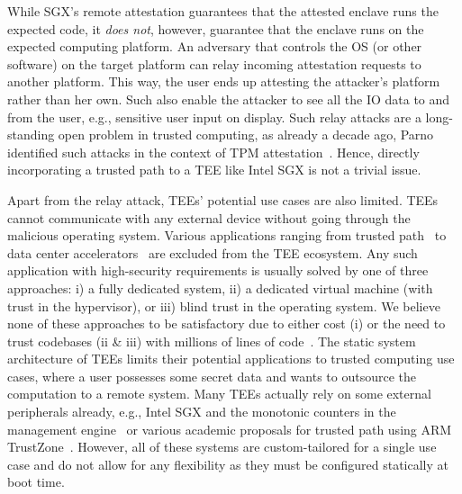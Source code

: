 While SGX's remote attestation guarantees that the attested enclave runs the expected code, it \emph{does not}, however,  guarantee that the enclave runs on the expected computing platform. An adversary that controls the OS (or other software) on the target platform can relay incoming attestation requests to another platform. This way, the user ends up attesting the attacker's platform rather than her own. Such also enable the attacker to see all the IO data to and from the user, e.g., sensitive user input on display. Such relay attacks are a long-standing open problem in trusted computing, as already a decade ago, Parno identified such attacks in the context of TPM attestation~\cite{parno2008bootstrapping}. Hence, directly incorporating a trusted path to a TEE like Intel SGX is not a trivial issue.



Apart from the relay attack, TEEs' potential use cases are also limited.  TEEs cannot communicate with any external device without going through the malicious operating system. Various applications ranging from trusted path~\cite{zhou2012building,Fidelius,protection} to data center accelerators~\cite{volos2018graviton} are excluded from the TEE ecosystem. Any such application with high-security requirements is usually solved by one of three approaches: i) a fully dedicated system, ii) a dedicated virtual machine (with trust in the hypervisor), or iii) blind trust in the operating system. We believe none of these approaches to be satisfactory due to either cost (i) or the need to trust codebases (ii \& iii) with millions of lines of code~\cite{torvalds2020linux,barham2003xen}.
The static system architecture of TEEs limits their potential applications to trusted computing use cases, where a user possesses some secret data and wants to outsource the computation to a remote system. Many TEEs actually rely on some external peripherals already, e.g., Intel SGX and the monotonic counters in the management engine~\cite{matetic2017rote} or various academic proposals for trusted path using ARM TrustZone~\cite{SeCloak,VButton}. However, all of these systems are custom-tailored for a single use case and do not allow for any flexibility as they must be configured statically at boot time.


